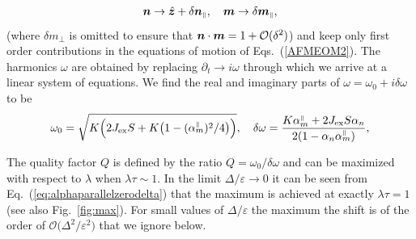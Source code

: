\begin{align}
    \boldsymbol{n}\rightarrow\hat{\boldsymbol{z}} + \delta\boldsymbol{n}_{\scriptscriptstyle\parallel},\quad \boldsymbol{m}\rightarrow \delta\boldsymbol{m}_{\scriptscriptstyle\parallel},
\end{align} 
(where $\delta m_\perp$ is omitted to ensure that $\boldsymbol{n}\cdot\boldsymbol{m}=1+\mathcal{O}(\delta^2)$) and keep only first order contributions in the equations of motion of Eqs.~(\ref{AFMEOM2}). The harmonics $\omega$ are obtained by replacing $\partial_t \rightarrow i\omega$ through which we arrive at a linear system of equations. We find the real and imaginary parts of $\omega = \omega_0 + i \delta\omega$ to be
\begin{align}
    \omega_0 = \sqrt{K\Big(2J_\text{ex}S + K\big(1- (\alpha_m^{{\scriptscriptstyle\parallel}})^2 / 4\big)\Big)},\quad \delta\omega =  \frac{K \alpha_m^{{\scriptscriptstyle\parallel}} + 2J_\text{ex}S \alpha_n }{2(1- \alpha_n \alpha_m^{{\scriptscriptstyle\parallel}})},
\end{align}

The quality factor $Q$ is defined by the ratio $Q=\omega_0/\delta\omega$ and can be maximized with respect to $\lambda$ when $\lambda\tau\sim1$. In the limit $\Delta/\varepsilon\rightarrow0$ it can be seen from Eq.~(\ref{eq:alphaparallelzerodelta}) that the maximum is achieved at exactly $\lambda\tau=1$ (see also Fig.~\ref{fig:max}). For small values of $\Delta/\varepsilon$ the maximum the shift is of the order of $\mathcal{O}\big(\Delta^2/\varepsilon^2\big)$ that we ignore below.

